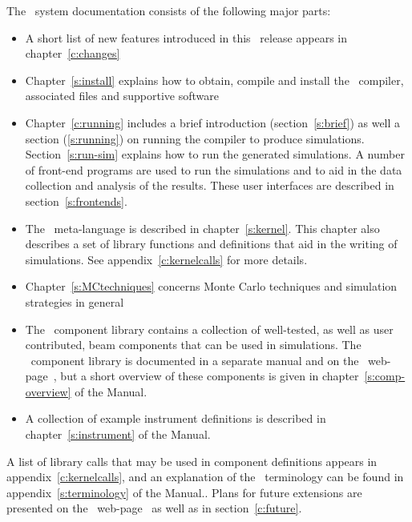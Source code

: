 The \MCS\ system documentation consists of the following major
parts:
\begin{itemize}
\item A short list of new features introduced in this \MCS\ release
  appears in chapter~\ref{c:changes}
\item Chapter~\ref{s:install} explains how to obtain, compile
  and install the \MCS\ compiler, associated files and supportive software
\item Chapter~\ref{c:running} includes a brief introduction
  (section~\ref{s:brief}) as well a section (\ref{s:running}) on running the compiler to produce
  simulations. Section~\ref{s:run-sim} explains how to run the generated
  simulations. A number of front-end programs are used to run the
  simulations and to aid in the data collection and analysis of the
  results. These user interfaces are described in section~\ref{s:frontends}.
\item The \MCS\ meta-language is described in chapter~\ref{s:kernel}. This
  chapter also describes a set of library functions and definitions
  that aid in the writing of simulations. See
  appendix~\ref{c:kernelcalls} for more details.
\item Chapter~\ref{s:MCtechniques} concerns Monte Carlo techniques
  and simulation strategies in general
\item The \MCS\ component library contains a collection of
  well-tested, as well as user contributed, beam components that can be used in simulations.
  The \MCS\ component library is documented in a separate manual
  and on the \MCS\ web-page~\cite{mcstas_webpage}, but a short overview of these
  components is given in chapter~\ref{s:comp-overview} of the Manual.
\item A collection of example instrument definitions is described in
  chapter~\ref{s:instrument} of the Manual.%

\end{itemize}

A list of library calls that may be used in component definitions 
appears in appendix~\ref{c:kernelcalls}, and
an explanation of the \MCS\ terminology can be
found in appendix~\ref{s:terminology} of the Manual..
Plans for future extensions are presented on the \MCS\ web-page~\cite{mcstas_webpage} as well as in section~\ref{c:future}.



